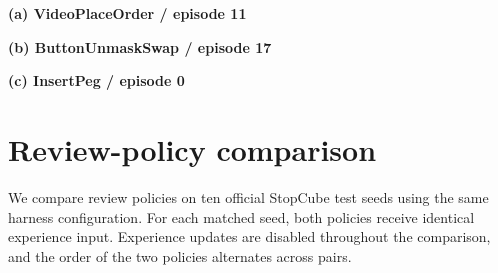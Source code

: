 \begin{casefigure}
{\small\bfseries (a) VideoPlaceOrder / episode 11\par}\vspace{3pt}
\hfill
{}\hfill
{}\par\vspace{8pt}
{\small\bfseries (b) ButtonUnmaskSwap / episode 17\par}\vspace{3pt}
\hfill
{}\hfill
{}\par\vspace{8pt}
{\small\bfseries (c) InsertPeg / episode 0\par}\vspace{3pt}
\hfill
{}\hfill
{}
\caption{Representative failed episodes, shown in temporal order. (a) VideoPlaceOrder loses track of the target after a late ring swap; frame 740 was inspected retrospectively. (b) ButtonUnmaskSwap moves to container manipulation before completing the button action, then retries. (c) InsertPeg remains incomplete despite repeated alignment and recovery attempts.}
\label{fig:failures}
\end{casefigure}

\FloatBarrier


\section{Review-policy comparison}
\label{app:paired}
We compare review policies on ten official StopCube test seeds using the same harness configuration. For each matched seed, both policies receive identical experience input. Experience updates are disabled throughout the comparison, and the order of the two policies alternates across pairs.


